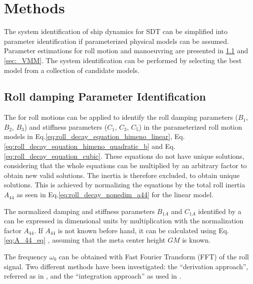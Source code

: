 \chapter{Methods\label{ch:methods}}
The system identification of ship dynamics for SDT can be simplified into parameter identification if parameterized physical models can be assumed. Parameter estimations for roll motion and manoeuvring are presented in \ref{sec:_roll} and \ref{sec:_VMM}. The system identification can be performed by selecting the best model from a collection of candidate models.

\section{Roll damping Parameter Identification} \label{sec:_roll}
\noindent The  for roll motions can be applied to identify the roll damping parameters ($B_1$, $B_2$, $B_3$) and stiffness parameters ($C_1$, $C_3$, $C_5$) in the parameterized roll motion models in Eq.\ref{eq:roll_decay_equation_himeno_linear}, Eq.\ref{eq:roll_decay_equation_himeno_quadratic_b} and Eq.\ref{eq:roll_decay_equation_cubic}. These equations do not have unique solutions, considering that the whole equations can be multiplied by an arbitrary factor to obtain new valid solutions. The inertia is therefore excluded, to obtain unique solutions. This is achieved by normalizing the equations by the total roll inertia $A_{44}$ as seen in Eq.\ref{eq:roll_decay_nonedim_a44} for the linear model.



\noindent The normalized damping and stiffness parameters $B_{1A}$ and $C_{1A}$ identified by a  can be expressed in dimensional units by multiplication with the normalization factor $A_{44}$. If $A_{44}$ is not known before hand, it can be calculated using Eq.\ref{eq:A_44_eq} \cite{piehl_ship_2016}, assuming that the meta center height $GM$ is known.


\noindent The frequency $\omega_0$ can be obtained with Fast Fourier Transform (FFT) of the roll signal. 
Two different  methods have been investigated: the ``derivation approach'', referred as  in \parencite{imo_1200_2006}, and the ``integration approach'' as used in \cite{soder_assessment_2019}. 

